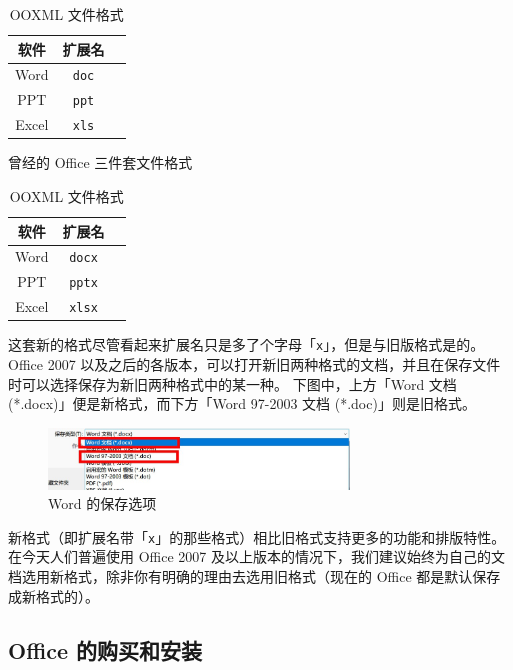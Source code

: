 \begin{table}[htb!]
  \begin{minipage}{7.5cm}
    \centering\begin{tabular}{ccc}
      \toprule
      软件 & 扩展名 \\
      \midrule
      Word & \verb|doc| \\
      PPT & \verb|ppt| \\
      Excel & \verb|xls| \\
      \bottomrule
    \end{tabular}
    \caption{曾经的 Office 三件套文件格式}
    \label{Old_Office_File_Format}
  \end{minipage}
  \begin{minipage}{6cm}
    \centering\begin{tabular}{ccc}
      \toprule
      软件 & 扩展名 \\
      \midrule
      Word & \verb|docx| \\
      PPT & \verb|pptx| \\
      Excel & \verb|xlsx| \\
      \bottomrule
    \end{tabular}
    \caption{OOXML 文件格式}
    \label{OOXML_File_Format}
  \end{minipage}
\end{table}

这套新的格式尽管看起来扩展名只是多了个字母「\verb|x|」，但是与旧版格式是的。
Office 2007 以及之后的各版本，可以打开新旧两种格式的文档，并且在保存文件时可以选择保存为新旧两种格式中的某一种。
下图中，上方「Word 文档 (*.docx)」便是新格式，而下方「Word 97-2003 文档 (*.doc)」则是旧格式。

\begin{figure}[htb!]
  \centering
  \includegraphics[width=8cm]{assets/Word_formats.jpg}
  \caption{Word 的保存选项}
  \label{Word_Formats}
\end{figure}

新格式（即扩展名带「\verb|x|」的那些格式）相比旧格式支持更多的功能和排版特性。
在今天人们普遍使用 Office 2007 及以上版本的情况下，我们建议始终为自己的文档选用新格式，除非你有明确的理由去选用旧格式（现在的 Office 都是默认保存成新格式的）。

\subsection{Office 的购买和安装}

